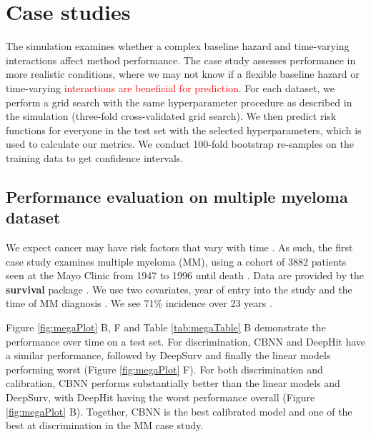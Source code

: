 \documentclass[preprint,12pt,authoryear]{elsarticle}
\begin{document}
\hypertarget{casestudies}{%
\section{Case studies}\label{casestudies}}

The simulation examines whether a complex baseline hazard and time-varying interactions affect method performance. The case study assesses performance in more realistic conditions, where we may not know if a flexible baseline hazard or time-varying \textcolor{red}{interactions are beneficial for prediction}. For each dataset, we perform a grid search with the same hyperparameter procedure as described in the simulation (three-fold cross-validated grid search). We then predict risk functions for everyone in the test set with the selected hyperparameters, which is used to calculate our metrics. We conduct 100-fold bootstrap re-samples on the training data to get confidence intervals.

\hypertarget{pe-multiplemyeloma}{%
\subsection{Performance evaluation on multiple myeloma dataset}\label{pe-multiplemyeloma}}
We expect cancer may have risk factors that vary with time \citep{coradini2000time} \textcolor{red}{\citep{salmon2023clinical}}. As such, the first case study examines multiple myeloma (MM), using a cohort of 3882 patients seen at the Mayo Clinic from 1947 to 1996 until death \citep{myeloma}. Data are provided by the \textbf{survival} package \citep{survpkg}. We use two covariates, year of entry into the study and the time of MM diagnosis \citep{myeloma}. We see 71\% incidence over 23 years \citep{myeloma}.

Figure \ref{fig:megaPlot} B, F and Table \ref{tab:megaTable} B demonstrate the performance over time on a test set. For discrimination, CBNN and DeepHit have a similar performance, followed by DeepSurv and finally the linear models performing worst (Figure \ref{fig:megaPlot} F). For both discrimination and calibration, CBNN performs substantially better than the linear models and DeepSurv, with DeepHit having the worst performance overall (Figure \ref{fig:megaPlot} B). Together, CBNN is the best calibrated model and one of the best at discrimination in the MM case study.

\end{document}
